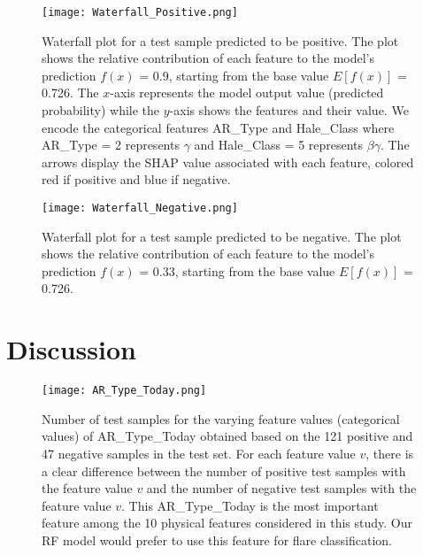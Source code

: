 \documentclass[draft]{agujournal2019}
\begin{document}
\begin{figure}
\centering
\hspace*{-0.7cm}
\texttt{[image: Waterfall\_Positive.png]}
\caption{Waterfall plot for a test sample predicted to be positive. The plot shows the relative contribution of each feature to
the model’s prediction $f(x)$ = 0.9, 
starting from the base value $E[f(x)]$ = 0.726. 
The $x$-axis represents the model output value (predicted probability)
while the $y$-axis 
shows the features and their value.
We encode the categorical features AR\_Type and Hale\_Class where AR\_Type = 2 represents $\gamma$
and
Hale\_Class = 5 represents $\beta$$\gamma$.
The arrows display the SHAP value associated with each
feature, colored red if positive and blue if negative.}
\label{fig:waterfallpositive}
\end{figure}


\begin{figure}
\centering
\hspace*{-0.7cm}
\texttt{[image: Waterfall\_Negative.png]}
\caption{Waterfall plot for a test sample predicted to be negative. The plot shows the relative contribution of each feature to
the model’s prediction $f(x)$ = 0.33, 
starting from the base value $E[f(x)]$ = 0.726.}
\label{fig:waterfallnegative}
\end{figure}

\section{Discussion}
\label{sec:discussion}

\begin{figure}
\centering
\hspace*{-0.7cm}
\texttt{[image: AR\_Type\_Today.png]}
\caption{Number of test samples for the varying feature values (categorical values) of AR\_Type\_Today obtained based on the 121 positive and 47 negative samples in the test set. For each feature value $v$, there is a clear difference between the number of positive test samples with the feature value $v$ and the number of negative test samples with the feature value $v$. This AR\_Type\_Today is the most important feature among the 10 physical features considered in this study. Our RF model would prefer to use this feature for flare classification.}
\label{fig:artypetoday}
\end{figure}
\end{document}
